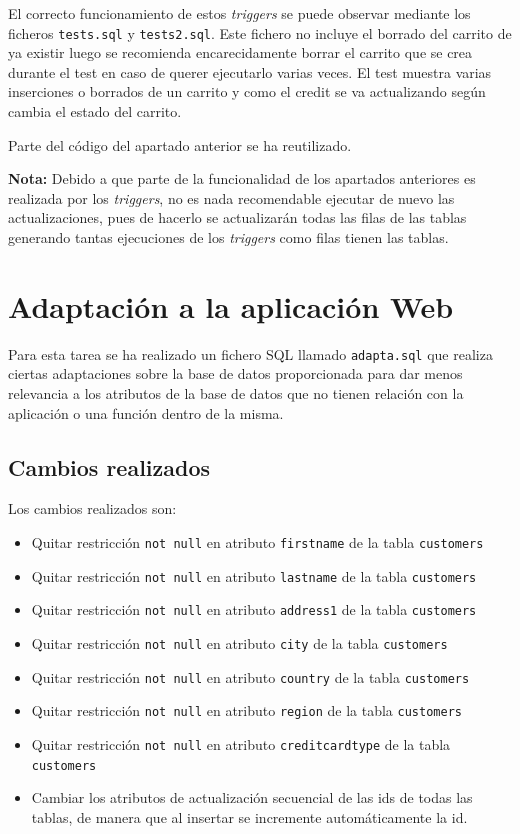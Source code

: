 \documentclass{article}
\begin{document}
El correcto funcionamiento de estos \textit{triggers} se puede observar mediante los ficheros \texttt{tests.sql} y \texttt{tests2.sql}. Este fichero no incluye el borrado del carrito de ya existir luego se recomienda encarecidamente borrar el carrito que se crea durante el test en caso de querer ejecutarlo varias veces. El test muestra varias inserciones o borrados de un carrito y como el credit se va actualizando según cambia el estado del carrito.

Parte del código del apartado anterior se ha reutilizado.

\textbf{Nota:} Debido a que parte de la funcionalidad de los apartados anteriores es realizada por los \textit{triggers}, no es nada recomendable ejecutar de nuevo las actualizaciones, pues de hacerlo se actualizarán todas las filas de las tablas generando tantas ejecuciones de los \textit{triggers} como filas tienen las tablas.

\section{Adaptación a la aplicación Web}
Para esta tarea se ha realizado un fichero SQL llamado \texttt{adapta.sql} que realiza ciertas adaptaciones sobre la base de datos proporcionada para dar menos relevancia a los atributos de la base de datos que no tienen relación con la aplicación o una función dentro de la misma.

\subsection{Cambios realizados}
Los cambios realizados son:

\begin{itemize}
\item Quitar restricción \texttt{not null} en atributo \texttt{firstname} de la tabla \texttt{customers}
\item Quitar restricción \texttt{not null} en atributo \texttt{lastname} de la tabla \texttt{customers}
\item Quitar restricción \texttt{not null} en atributo \texttt{address1} de la tabla \texttt{customers}
\item Quitar restricción \texttt{not null} en atributo \texttt{city} de la tabla \texttt{customers}
\item Quitar restricción \texttt{not null} en atributo \texttt{country} de la tabla \texttt{customers}
\item Quitar restricción \texttt{not null} en atributo \texttt{region} de la tabla \texttt{customers}
\item Quitar restricción \texttt{not null} en atributo \texttt{creditcardtype} de la tabla \texttt{customers}
\item Cambiar los atributos de actualización secuencial de las ids de todas las tablas, de manera que al insertar se incremente automáticamente la id.
\end{itemize}
\newpage
\end{document}
